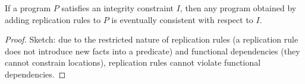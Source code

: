 
\begin{lemma}
If a program $P$ satisfies an integrity constraint $I$, then any program obtained by adding replication rules to $P$ is eventually consistent with respect to $I$.
\end{lemma}
\begin{proof}
Sketch: due to the restricted nature of replication rules (a replication rule does not introduce new facts into a predicate) and functional dependencies (they cannot constrain locations), replication rules cannot violate functional dependencies.
\end{proof}
